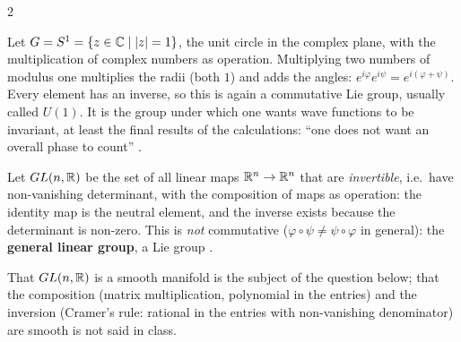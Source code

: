 \begin{paracol}{2}
\begin{example}[The circle group $S^1=U(1)$]\label{ex:ll-u1}
Let $G=S^1=\{z\in\mathbb{C}\mid |z|=1\}$, the unit circle in the complex plane, with the multiplication of complex numbers as operation. Multiplying two numbers of modulus one multiplies the radii (both $1$) and adds the angles: $e^{i\varphi}e^{i\psi}=e^{i(\varphi+\psi)}$. Every element has an inverse, so this is again a commutative Lie group, usually called $U(1)$. It is the group under which one wants wave functions to be invariant, at least the final results of the calculations: ``one does not want an overall phase to count''
    .
\end{example}

\begin{example}\label{ex:ll-gl}
Let $GL(n,\mathbb{R})$ be the set of all linear maps $\mathbb{R}^n\to\mathbb{R}^n$ that are \emph{invertible}, i.e.\ have non-vanishing determinant, with the composition of maps as operation: the identity map is the neutral element, and the inverse exists because the determinant is non-zero. This is \emph{not} commutative ($\varphi\circ\psi\ne\psi\circ\varphi$ in general): the \textbf{general linear group}, a Lie group   .
\end{example}
\begin{coursenote}
That $GL(n,\mathbb{R})$ is a smooth manifold is the subject of the question below; that the composition (matrix multiplication, polynomial in the entries) and the inversion (Cramer's rule: rational in the entries with non-vanishing denominator) are smooth is not said in class. 
\end{coursenote}


\end{paracol}

